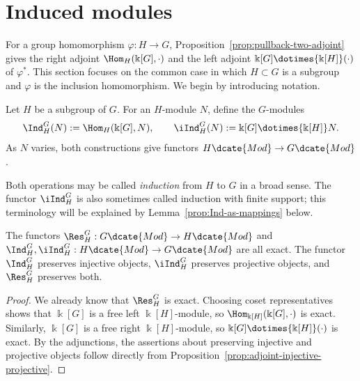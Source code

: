 
\section{Induced modules}\label{sec:induced-module}
\hypertarget{o014.aljabr2.chapter6.induced-modules}{ }

For a group homomorphism $\varphi:H\to G$,
Proposition~\ref{prop:pullback-two-adjoint} gives the right adjoint
$\Hom_H(\Bbbk[G],\cdot)$ and the left adjoint
$\Bbbk[G]\dotimes{\Bbbk[H]}(\cdot)$ of $\varphi^*$. This section focuses
on the common case in which $H\subset G$ is a subgroup and $\varphi$ is the
inclusion homomorphism. We begin by introducing notation.

\begin{definition}\label{def:induced-module}
	Let $H$ be a subgroup of $G$. For an $H$-module $N$, define the
	$G$-modules
	\[ \Ind^G_H(N):=\Hom_H(\Bbbk[G],N),\qquad
	\iInd^G_H(N):=\Bbbk[G]\dotimes{\Bbbk[H]}N. \]
	As $N$ varies, both constructions give functors
	$H\dcate{Mod}\to G\dcate{Mod}$.
\end{definition}

Both operations may be called \emph{induction} from $H$ to $G$ in a broad
sense. The functor $\iInd^G_H$ is also sometimes called induction with finite
support; this terminology will be explained by
Lemma~\ref{prop:Ind-as-mappings} below.

\begin{proposition}\label{prop:Ind-preservation}
	The functors $\Res^G_H:G\dcate{Mod}\to H\dcate{Mod}$ and
	$\Ind^G_H,\iInd^G_H:H\dcate{Mod}\to G\dcate{Mod}$ are all exact.
	The functor $\Ind^G_H$ preserves injective objects,
	$\iInd^G_H$ preserves projective objects, and $\Res^G_H$ preserves both.
\end{proposition}
\begin{proof}
	We already know that $\Res^G_H$ is exact. Choosing coset representatives
	shows that $\Bbbk[G]$ is a free left $\Bbbk[H]$-module, so
	$\Hom_{\Bbbk[H]}(\Bbbk[G],\cdot)$ is exact. Similarly,
	$\Bbbk[G]$ is a free right $\Bbbk[H]$-module, so
	$\Bbbk[G]\dotimes{\Bbbk[H]}(\cdot)$ is exact. By the adjunctions, the
	assertions about preserving injective and projective objects follow
	directly from Proposition~\ref{prop:adjoint-injective-projective}.
\end{proof}

